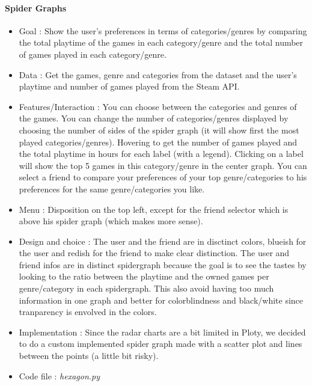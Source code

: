 \documentclass{article}
\begin{document}
	\paragraph{Spider Graphs}
	\begin{itemize}
		\item Goal : Show the user's preferences in terms of categories/genres by comparing the total playtime of the games in each category/genre and the total number of games played in each category/genre.
		\item Data : Get the games, genre and categories from the dataset and the user's playtime and number of games played from the Steam API.
		\item Features/Interaction : You can choose between the categories and genres of the games. You can change the number of categories/genres displayed by choosing the number of sides of the spider graph (it will show first the most played categories/genres). Hovering to get the number of games played and the total playtime in hours for each label (with a legend). Clicking on a label will show the top 5 games in this category/genre in the center graph. You can select a friend to compare your preferences of your top genre/categories to his preferences for the same genre/categories you like.
		\item Menu : Disposition on the top left, except for the friend selector which is above his spider graph (which makes more sense).
		\item Design and choice : The user and the friend are in disctinct colors, blueish for the user and redish for the friend to make clear distinction. The user and friend infos are in distinct spidergraph because the goal is to see the tastes by looking to the ratio between the playtime and the owned games per genre/category in each spidergraph. This also avoid having too much information in one graph and better for colorblindness and black/white since tranparency is envolved in the colors.
		\item Implementation : Since the radar charts are a bit limited in Ploty, we decided to do a custom implemented spider graph made with a scatter plot and lines between the points (a little bit risky).
		\item Code file : \textit{hexagon.py}
	\end{itemize}
\end{document}
